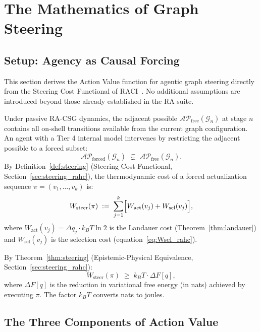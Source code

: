 \documentclass[11pt,a4paper]{article}
\theoremstyle{remark}
\newcommand{\AP}{\mathcal{AP}}
\newcommand{\GG}{\mathcal{G}}
\begin{document}
\section{The Mathematics of Graph Steering}
\label{sec:steering}

\subsection{Setup: Agency as Causal Forcing}

This section derives the Action Value function for agentic graph steering directly
from the Steering Cost Functional of RACI~\citep{Sandeman2026c}. No additional
assumptions are introduced beyond those already established in the RA suite.

Under passive RA-CSG dynamics, the adjacent possible
$\AP_{\mathrm{free}}(\GG_n)$ at stage $n$ contains all on-shell transitions
available from the current graph configuration. An agent with a Tier 4 internal
model intervenes by restricting the adjacent possible to a forced subset:
\begin{equation}
  \AP_{\mathrm{forced}}(\GG_n) \;\subsetneq\; \AP_{\mathrm{free}}(\GG_n).
\end{equation}
By Definition~\ref{def:steering} (Steering Cost Functional,
Section~\ref{sec:steering_rahc}), the thermodynamic cost of a forced actualization
sequence $\pi = (v_1, \ldots, v_k)$ is:
\begin{equation}
  W_{\mathrm{steer}}(\pi)
  \;:=\;
  \sum_{j=1}^{k}
  \Bigl[
    W_{\mathrm{act}}(v_j) + W_{\mathrm{sel}}(v_j)
  \Bigr],
  \label{eq:Wsteer}
\end{equation}
where $W_{\mathrm{act}}(v_j) = \Delta q_j \cdot k_BT \ln 2$ is the Landauer cost
(Theorem~\ref{thm:landauer}) and $W_{\mathrm{sel}}(v_j)$ is the selection cost
(equation~\eqref{eq:Wsel_rahc}).

By Theorem~\ref{thm:steering} (Epistemic-Physical Equivalence,
Section~\ref{sec:steering_rahc}):
\begin{equation}
  W_{\mathrm{steer}}(\pi) \;\geq\; k_BT \cdot \Delta F[q],
  \label{eq:steer_bound}
\end{equation}
where $\Delta F[q]$ is the reduction in variational free energy (in nats) achieved
by executing $\pi$. The factor $k_BT$ converts nats to joules.

\subsection{The Three Components of Action Value}
\end{document}
